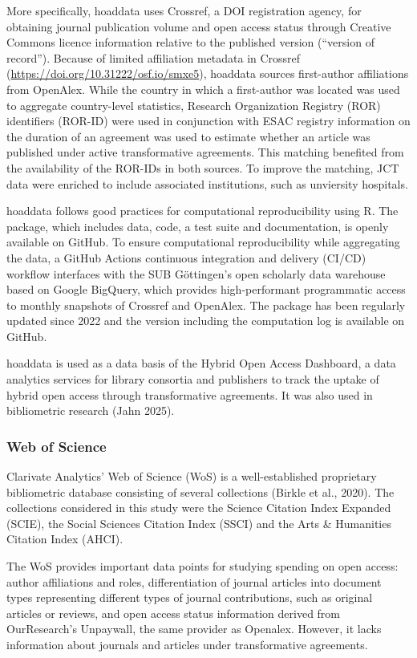 \documentclass[a4paper,man,floatsintext,longtable,noextraspace,12pt]{apa6}
\begin{document}
More specifically, hoaddata uses Crossref, a DOI registration agency,
for obtaining journal publication volume and open access status through
Creative Commons licence information relative to the published version
(``version of record''). Because of limited affiliation metadata in
Crossref (\url{https://doi.org/10.31222/osf.io/smxe5}), hoaddata sources
first-author affiliations from OpenAlex. While the country in which a
first-author was located was used to aggregate country-level statistics,
Research Organization Registry (ROR) identifiers (ROR-ID) were used in
conjunction with ESAC registry information on the duration of an
agreement was used to estimate whether an article was published under
active transformative agreements. This matching benefited from the
availability of the ROR-IDs in both sources. To improve the matching,
JCT data were enriched to include associated institutions, such as
unviersity hospitals.

hoaddata follows good practices for computational reproducibility using
R. The package, which includes data, code, a test suite and
documentation, is openly available on GitHub. To ensure computational
reproducibility while aggregating the data, a GitHub Actions continuous
integration and delivery (CI/CD) workflow interfaces with the SUB
Göttingen's open scholarly data warehouse based on Google BigQuery,
which provides high-performant programmatic access to monthly snapshots
of Crossref and OpenAlex. The package has been regularly updated since
2022 and the version including the computation log is available on
GitHub.

hoaddata is used as a data basis of the Hybrid Open Access Dashboard, a
data analytics services for library consortia and publishers to track
the uptake of hybrid open access through transformative agreements. It
was also used in bibliometric research (Jahn 2025).

\subsubsection{Web of Science}\label{web-of-science}

Clarivate Analytics' Web of Science (WoS) is a well-established
proprietary bibliometric database consisting of several collections
(Birkle et al., 2020). The collections considered in this study were the
Science Citation Index Expanded (SCIE), the Social Sciences Citation
Index (SSCI) and the Arts \& Humanities Citation Index (AHCI).

The WoS provides important data points for studying spending on open
access: author affiliations and roles, differentiation of journal
articles into document types representing different types of journal
contributions, such as original articles or reviews, and open access
status information derived from OurResearch's Unpaywall, the same
provider as Openalex. However, it lacks information about journals and
articles under transformative agreements.
\end{document}
